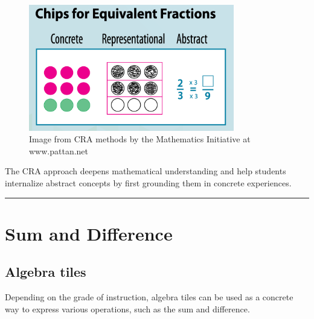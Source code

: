 \documentclass[
  letterpaper,
  DIV=11,
  numbers=noendperiod]{scrartcl}
\begin{document}
\begin{figure}[H]

{\centering \includegraphics[width=0.8\textwidth,height=\textheight]{../img/mod03/cra-chips-equivalent-fractions.png}

}

\caption{Image from CRA methods by the Mathematics Initiative at
www.pattan.net}

\end{figure}%

The CRA approach deepens mathematical understanding and help students
internalize abstract concepts by first grounding them in concrete
experiences.

\begin{center}\rule{0.5\linewidth}{0.5pt}\end{center}

\section{Sum and Difference}\label{sum-and-difference}

\subsection{Algebra tiles}\label{algebra-tiles}

Depending on the grade of instruction, algebra tiles can be used as a
concrete way to express various operations, such as the sum and
difference.
\end{document}
